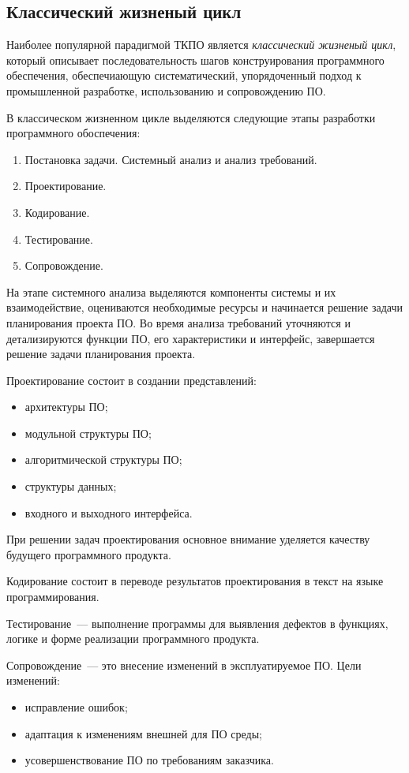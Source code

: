 \subsection{Классический жизненый цикл}
Наиболее популярной парадигмой ТКПО является {\em классический 
жизненый цикл}, который описывает последовательность шагов 
конструирования программного обеспечения, обеспечиающую 
систематический, упорядоченный подход к промышленной 
разработке, использованию и сопровождению ПО.

В классическом жизненном цикле выделяются следующие этапы разработки 
программного обоспечения:
\begin{enumerate}
  \item Постановка задачи. Системный анализ и анализ требований. 
  \item Проектирование.
  \item Кодирование.
  \item Тестирование.
  \item Сопровождение.
\end{enumerate}

На этапе системного анализа выделяются компоненты системы 
и их взаимодействие, оцениваются необходимые ресурсы и 
начинается решение задачи планирования проекта ПО. 
Во время анализа требований уточняются и детализируются 
функции ПО, его характеристики и интерфейс, завершается 
решение задачи планирования проекта.

Проектирование состоит в создании представлений:
\begin{itemize}
  \item архитектуры ПО;
  \item модульной структуры ПО;
  \item алгоритмической структуры ПО;
  \item структуры данных;
  \item входного и выходного интерфейса.
\end{itemize}
При решении задач проектирования основное внимание 
уделяется качеству будущего программного продукта.

Кодирование состоит в переводе результатов проектирования 
в текст на языке программирования. 

Тестирование~--- выполнение программы для выявления дефектов в функциях, 
логике и форме реализации программного продукта.

Сопровождение~--- это внесение изменений в эксплуатируемое ПО. 
Цели изменений:
\begin{itemize}
  \item исправление ошибок;
  \item адаптация к изменениям внешней для ПО среды;
  \item усовершенствование ПО по требованиям заказчика.
\end{itemize}

